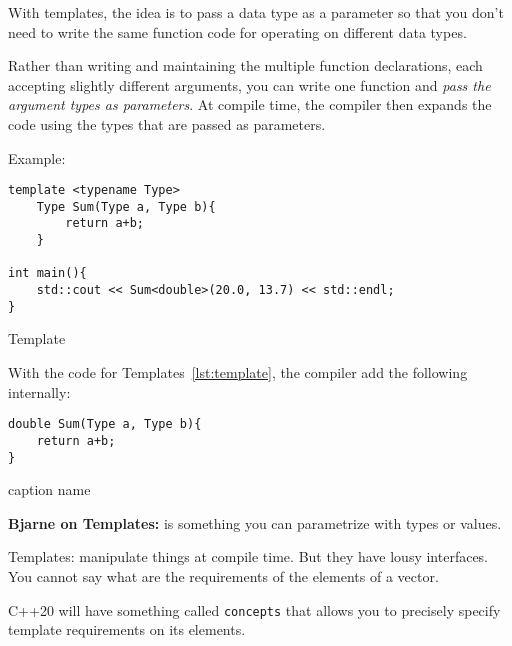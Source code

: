 \documentclass[11pt, a4paper]{article}
\begin{document}
With templates, the idea is to pass a data type as a parameter so that you don't need to write the same function code for operating on different data types. 

Rather than writing and maintaining the multiple function declarations, each accepting slightly different arguments, you can write one function and \textit{pass the argument types as parameters}. At compile time, the compiler then expands the code using the types that are passed as parameters. 

Example:

\begin{listing}[hbt!]
\begin{verbatim}
template <typename Type>
	Type Sum(Type a, Type b){
		return a+b;
	}

int main(){
	std::cout << Sum<double>(20.0, 13.7) << std::endl;
}
\end{verbatim}
\caption{Template}
\label{lst:template}
\end{listing}



With the code for Templates~\ref{lst:template}, the compiler add the following internally:

\begin{listing}[hbt!]
\begin{verbatim}
double Sum(Type a, Type b){
	return a+b;
}
\end{verbatim}
\caption{caption name}
\label{lst:caption_name}
\end{listing}




\textbf{Bjarne on Templates:} is something you can parametrize with types or values. 

Templates: manipulate things at compile time. But they have lousy interfaces. You cannot say what are the requirements of the elements of a vector.

C++20 will have something called \texttt{concepts} that allows you to precisely specify template requirements on its elements.
\end{document}
